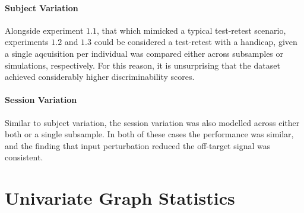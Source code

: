 \documentclass[fleqn,10pt]{SelfArx} %
\begin{document}
\paragraph{Subject Variation}
Alongside experiment $1.1$, that which mimicked a typical test-retest scenario, experiments $1.2$ and $1.3$ could be
considered a test-retest with a handicap, given a single aqcuisition per individual was compared either across
subsamples or simulations, respectively. For this reason, it is unsurprising that the dataset achieved considerably
higher discriminability scores. 

\paragraph{Session Variation}
Similar to subject variation, the session variation was also modelled across either both or a single subsample. In both
of these cases the performance was similar, and the finding that input perturbation reduced the off-target signal was
consistent.

\clearpage
\section{Univariate Graph Statistics}
\label{supsec:univar}
\end{document}
